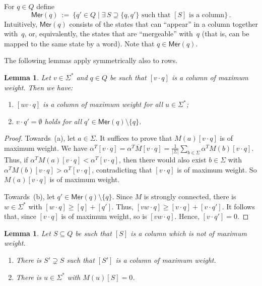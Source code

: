 \documentclass[11pt,a4paper]{amsart}
\newcommand{\Mer}{\mathsf{Mer}}
\theoremstyle{plain}
\newtheorem{lem}[thm]{Lemma}
\theoremstyle{definition}
\theoremstyle{defC}
\theoremstyle{thmC}
\theoremstyle{plain}
\numberwithin{equation}{section}
\begin{document}
For $q \in Q$ define
\[
 \Mer(q) \ := \ \{q' \in Q \mid \exists\,S \supseteq \{q,q'\} \text{ such that } [S] \text{ is a column}\}\,.
\]
Intuitively, $\Mer(q)$ consists of the states that can ``appear'' in a column together with~$q$, or, equivalently, the states that are ``mergeable'' with~$q$ (that is, can be mapped to the same state by a word).
Note that $q \in \Mer(q)$. 

The following lemmas apply symmetrically also to rows.

\begin{lem} \label{lem:max-column}
Let $v \in \Sigma^*$ and $q \in Q$ be such that $[v \cdot q]$ is a column of maximum weight. Then we have:
\begin{enumerate}
\item[(a)] $[u v \cdot q]$ is a column of maximum weight for all $u \in \Sigma^*$;
\item[(b)] $v \cdot q' = \emptyset$ holds for all $q' \in \Mer(q) \setminus \{q\}$.
\end{enumerate}
\end{lem}

\begin{proof}
Towards~(a), let $a \in \Sigma$.
It suffices to prove that $M(a) [v \cdot q]$ is of maximum weight.
We have $\alpha^T [v \cdot q] = \alpha^T \overline{M} [v \cdot q] = \frac{1}{|\Sigma|} \sum_{b \in \Sigma} \alpha^T M(b)[v \cdot q]$.
Thus, if $\alpha^T M(a) [v \cdot q] < \alpha^T [v \cdot q]$, then there would also exist $b \in \Sigma$ with $\alpha^T M(b) [v \cdot q] > \alpha^T [v \cdot q]$, contradicting that $[v \cdot q]$ is of maximum weight.
So $M(a)[v \cdot q]$ is of maximum weight.

Towards~(b), let $q' \in \Mer(q) \setminus \{q\}$.
Since $M$ is strongly connected, there is $w \in \Sigma^*$ with $[w \cdot q] \ge [q] + [q']$.
Thus, $[v w \cdot q] \ge [v \cdot q] + [v \cdot q']$.
It follows that, since $[v \cdot q]$ is of maximum weight, so is $[v w \cdot q]$.
Hence, $[v \cdot q'] = 0$.
\end{proof}

\begin{lem} \label{lem:non-max-column}
Let $S \subseteq Q$ be such that $[S]$ is a column which is not of maximum weight.
\begin{enumerate}
\item[(a)] There is $S' \supsetneq S$ such that $[S']$ is a column of maximum weight.
\item[(b)] There is $u \in \Sigma^*$ with $M(u) [S] = 0$.
\end{enumerate}
\end{lem}
\end{document}
